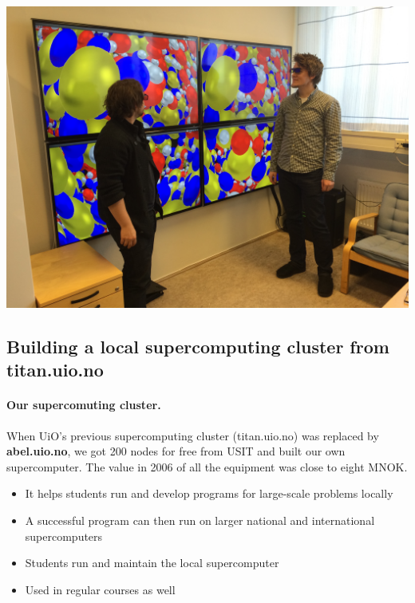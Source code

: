 \documentclass[%
twoside,                 %
final,                   %
10pt]{article}
\begin{document}
\noindent





\centerline{\includegraphics[width=1.0\linewidth]{fig-future/visualize.jpg}}






\subsection{Building a local supercomputing cluster from titan.uio.no}

\paragraph{Our supercomuting cluster.}
When UiO's previous supercomputing cluster (titan.uio.no) was replaced by \textbf{abel.uio.no}, we got 200 nodes for free from USIT and built our own supercomputer. The value in 2006 of all the equipment was close to eight MNOK.
\begin{itemize}
\item It helps students run and develop programs for large-scale problems locally

\item A successful program can then run on larger national and international supercomputers

\item Students run and maintain the local supercomputer

\item Used in regular courses as well
\end{itemize}
\end{document}
